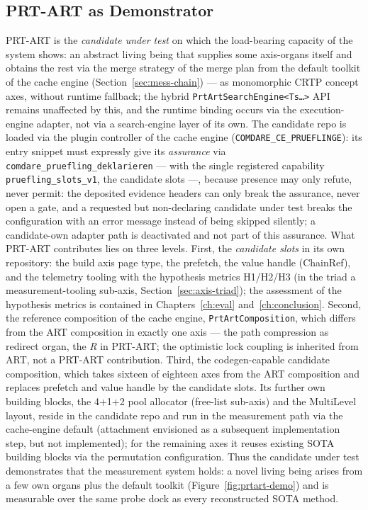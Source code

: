 \begin{nurlang}
\section{PRT-ART as Demonstrator}\label{sec:prtart-demo}
PRT-ART is the \emph{candidate under test} on which the load-bearing capacity of the system shows: an abstract living being that supplies some
axis-organs itself and obtains the rest via the merge strategy of the merge plan from the
default toolkit of the cache engine (Section~\ref{sec:mess-chain}) --- as monomorphic
CRTP concept axes, without runtime fallback; the hybrid
\texttt{PrtArtSearchEngine<Ts\ldots>} API remains unaffected by this, and the runtime binding occurs via
the execution-engine adapter, not via a search-engine layer of its own. The
candidate repo is loaded via the plugin controller of the cache engine
(\texttt{COMDARE\_\allowbreak{}CE\_\allowbreak{}PRUEFLINGE}): its entry snippet must expressly give its
\emph{assurance} via \texttt{comdare\_\allowbreak{}pruefling\_\allowbreak{}deklarieren} ---
with the single registered capability
\texttt{pruefling\_\allowbreak{}slots\_\allowbreak{}v1}, the candidate slots ---, because
presence may only refute, never permit: the deposited evidence headers can only
break the assurance, never open a gate, and a requested but non-declaring candidate under test
breaks the configuration with an error message instead of being skipped silently; a candidate-own
adapter path is deactivated and not part of this assurance.
What PRT-ART contributes lies on three levels. First, the \emph{candidate slots} in its own repository:
the build axis page type, the prefetch, the value handle (ChainRef), and the telemetry tooling with the
hypothesis metrics H1/H2/H3 (in the triad a measurement-tooling sub-axis,
Section~\ref{sec:axis-triad}); the assessment of the hypothesis metrics is contained in
Chapters~\ref{ch:eval} and~\ref{ch:conclusion}. Second, the reference composition of the cache engine,
\texttt{PrtArtComposition}, which differs from the ART composition in exactly one axis --- the
path compression as redirect organ, the \emph{R} in PRT-ART\@; the optimistic lock coupling is inherited from
ART, not a PRT-ART contribution. Third, the codegen-capable candidate composition, which takes sixteen of
eighteen axes from the ART composition and replaces prefetch and value handle by the
candidate slots. Its further own building blocks, the 4+1+2 pool allocator
(free-list sub-axis) and the MultiLevel layout, reside in the candidate repo and run in the measurement path via
the cache-engine default (attachment envisioned as a subsequent implementation step, but not
implemented); for the remaining axes it reuses existing
SOTA building blocks via the permutation configuration. Thus the candidate under test demonstrates that the measurement system
holds: a novel living being arises from a few own organs plus the default toolkit
(Figure~\ref{fig:prtart-demo}) and is measurable over the same probe dock as every reconstructed
SOTA method.


\end{nurlang}
